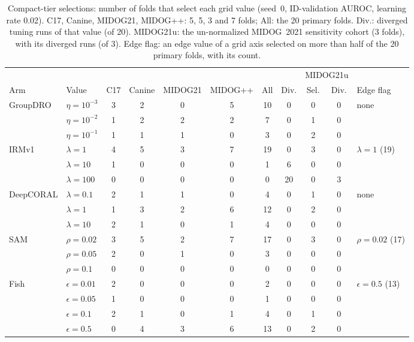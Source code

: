 \begin{table}[width=\linewidth,pos=p]
\caption{Compact-tier selections: number of folds that select each grid value
(seed~0, ID-validation AUROC, learning rate 0.02). C17, Canine, MIDOG21,
MIDOG++: 5, 5, 3 and 7 folds; All: the 20 primary folds. Div.: diverged
tuning runs of that value (of 20). MIDOG21u: the un-normalized MIDOG~2021
sensitivity cohort (3 folds), with its diverged runs (of 3). Edge flag: an
edge value of a grid axis selected on more than half of the 20 primary folds,
with its count.}
\label{tab:tuning-c}
\footnotesize
\begin{tabular*}{\tblwidth}{@{\extracolsep{\fill}}ll*{8}{c}>{\raggedright\arraybackslash}p{2.6cm}@{}}
\toprule
 & & & & & & & & \multicolumn{2}{c}{MIDOG21u} & \\
\cmidrule(lr){9-10}
Arm & Value & C17 & Canine & MIDOG21 & MIDOG++ & All & Div. & Sel. & Div. & Edge flag \\
\midrule
GroupDRO & $\eta{=}10^{-3}$ & 3 & 2 & 0 & 5 & 10 & 0 & 0 & 0 & none \\
 & $\eta{=}10^{-2}$ & 1 & 2 & 2 & 2 & 7 & 0 & 1 & 0 &  \\
 & $\eta{=}10^{-1}$ & 1 & 1 & 1 & 0 & 3 & 0 & 2 & 0 &  \\
\addlinespace
IRMv1 & $\lambda{=}1$ & 4 & 5 & 3 & 7 & 19 & 0 & 3 & 0 & $\lambda{=}1$ (19) \\
 & $\lambda{=}10$ & 1 & 0 & 0 & 0 & 1 & 6 & 0 & 0 &  \\
 & $\lambda{=}100$ & 0 & 0 & 0 & 0 & 0 & 20 & 0 & 3 &  \\
\addlinespace
DeepCORAL & $\lambda{=}0.1$ & 2 & 1 & 1 & 0 & 4 & 0 & 1 & 0 & none \\
 & $\lambda{=}1$ & 1 & 3 & 2 & 6 & 12 & 0 & 2 & 0 &  \\
 & $\lambda{=}10$ & 2 & 1 & 0 & 1 & 4 & 0 & 0 & 0 &  \\
\addlinespace
SAM & $\rho{=}0.02$ & 3 & 5 & 2 & 7 & 17 & 0 & 3 & 0 & $\rho{=}0.02$ (17) \\
 & $\rho{=}0.05$ & 2 & 0 & 1 & 0 & 3 & 0 & 0 & 0 &  \\
 & $\rho{=}0.1$ & 0 & 0 & 0 & 0 & 0 & 0 & 0 & 0 &  \\
\addlinespace
Fish & $\epsilon{=}0.01$ & 2 & 0 & 0 & 0 & 2 & 0 & 0 & 0 & $\epsilon{=}0.5$ (13) \\
 & $\epsilon{=}0.05$ & 1 & 0 & 0 & 0 & 1 & 0 & 0 & 0 &  \\
 & $\epsilon{=}0.1$ & 2 & 1 & 0 & 1 & 4 & 0 & 1 & 0 &  \\
 & $\epsilon{=}0.5$ & 0 & 4 & 3 & 6 & 13 & 0 & 2 & 0 &  \\

\end{tabular*}
\end{table}
